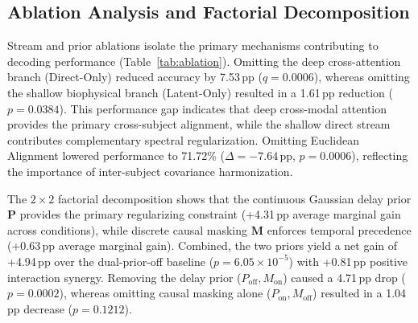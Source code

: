 \documentclass[journal]{IEEEtran}
\begin{document}
\subsection{Ablation Analysis and Factorial Decomposition}
Stream and prior ablations isolate the primary mechanisms contributing to decoding performance (Table~\ref{tab:ablation}). Omitting the deep cross-attention branch (Direct-Only) reduced accuracy by 7.53\,pp ($q = 0.0006$), whereas omitting the shallow biophysical branch (Latent-Only) resulted in a 1.61\,pp reduction ($p = 0.0384$). This performance gap indicates that deep cross-modal attention provides the primary cross-subject alignment, while the shallow direct stream contributes complementary spectral regularization. Omitting Euclidean Alignment lowered performance to 71.72\% ($\Delta = -7.64$\,pp, $p = 0.0006$), reflecting the importance of inter-subject covariance harmonization.

The $2 \times 2$ factorial decomposition shows that the continuous Gaussian delay prior $\mathbf{P}$ provides the primary regularizing constraint (+4.31\,pp average marginal gain across conditions), while discrete causal masking $\mathbf{M}$ enforces temporal precedence (+0.63\,pp average marginal gain). Combined, the two priors yield a net gain of +4.94\,pp over the dual-prior-off baseline ($p = 6.05\times 10^{-5}$) with +0.81\,pp positive interaction synergy. Removing the delay prior ($P_{\mathrm{off}}, M_{\mathrm{on}}$) caused a 4.71\,pp drop ($p = 0.0002$), whereas omitting causal masking alone ($P_{\mathrm{on}}, M_{\mathrm{off}}$) resulted in a 1.04\,pp decrease ($p = 0.1212$).
\end{document}
